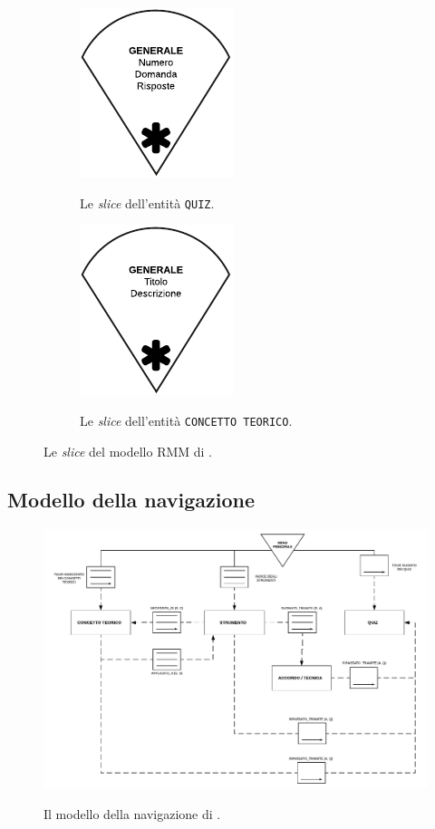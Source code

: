 \begin{figure}[H]\ContinuedFloat
	\begin{subfigure}[t]{.5\textwidth}
		\centering
		\includegraphics[scale=1]{modello_rmm/slice_quiz}
		\label{fig:slice:quiz}
		\caption{Le \emph{slice} dell'entità \texttt{QUIZ}.}
	\end{subfigure}%
	\begin{subfigure}[t]{.5\textwidth}
		\centering
		\includegraphics[scale=1]{modello_rmm/slice_concetto_teorico}
		\label{fig:slice:concetto-teorico}
		\caption{Le \emph{slice} dell'entità \texttt{CONCETTO TEORICO}.}
	\end{subfigure}
	\label{fig:slice}
	\caption{Le \emph{slice} del modello RMM di \ProjectTitle{}.}
\end{figure}
\subsection{Modello della navigazione}
\begin{figure}[H]
	\centering
	\includegraphics[width=\textwidth]{modello_rmm/navigazione}
	\label{fig:modello-navigazione}
	\caption{Il modello della navigazione di \ProjectTitle{}.}
\end{figure}